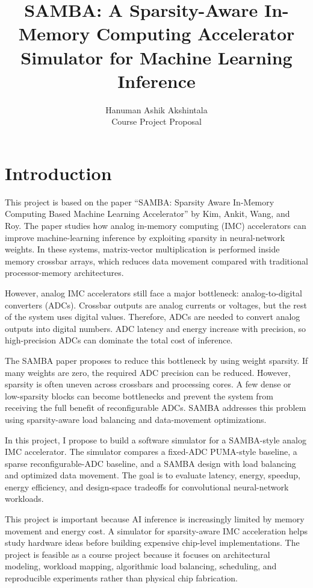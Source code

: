 \documentclass[11pt]{article}
\title{\textbf{SAMBA: A Sparsity-Aware In-Memory Computing Accelerator Simulator for Machine Learning Inference}}
\author{Hanuman Ashik Akshintala\\Course Project Proposal}
\date{}
\begin{document}
\maketitle

\section{Introduction}

This project is based on the paper ``SAMBA: Sparsity Aware In-Memory Computing Based Machine Learning Accelerator'' by Kim, Ankit, Wang, and Roy. The paper studies how analog in-memory computing (IMC) accelerators can improve machine-learning inference by exploiting sparsity in neural-network weights. In these systems, matrix-vector multiplication is performed inside memory crossbar arrays, which reduces data movement compared with traditional processor-memory architectures.

However, analog IMC accelerators still face a major bottleneck: analog-to-digital converters (ADCs). Crossbar outputs are analog currents or voltages, but the rest of the system uses digital values. Therefore, ADCs are needed to convert analog outputs into digital numbers. ADC latency and energy increase with precision, so high-precision ADCs can dominate the total cost of inference.

The SAMBA paper proposes to reduce this bottleneck by using weight sparsity. If many weights are zero, the required ADC precision can be reduced. However, sparsity is often uneven across crossbars and processing cores. A few dense or low-sparsity blocks can become bottlenecks and prevent the system from receiving the full benefit of reconfigurable ADCs. SAMBA addresses this problem using sparsity-aware load balancing and data-movement optimizations.

In this project, I propose to build a software simulator for a SAMBA-style analog IMC accelerator. The simulator compares a fixed-ADC PUMA-style baseline, a sparse reconfigurable-ADC baseline, and a SAMBA design with load balancing and optimized data movement. The goal is to evaluate latency, energy, speedup, energy efficiency, and design-space tradeoffs for convolutional neural-network workloads.

This project is important because AI inference is increasingly limited by memory movement and energy cost. A simulator for sparsity-aware IMC acceleration helps study hardware ideas before building expensive chip-level implementations. The project is feasible as a course project because it focuses on architectural modeling, workload mapping, algorithmic load balancing, scheduling, and reproducible experiments rather than physical chip fabrication.
\end{document}
